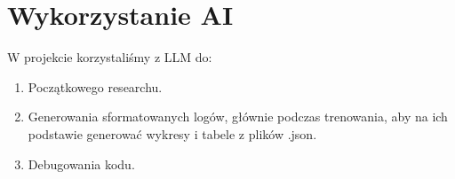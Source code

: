 \section{Wykorzystanie AI}
W projekcie korzystaliśmy z LLM do:
\begin{enumerate}
    \item Początkowego researchu.
    \item Generowania sformatowanych logów, głównie podczas trenowania,
    aby na ich podstawie generować wykresy i tabele z plików .json.
    \item Debugowania kodu.
\end{enumerate}